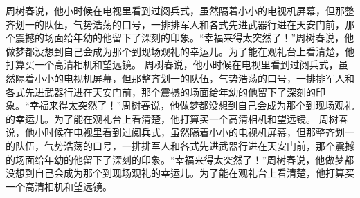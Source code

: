 \newpage
周树春说，他小时候在电视里看到过阅兵式，虽然隔着小小的电视机屏幕，但那整齐划一的队伍，气势浩荡的口号，一排排军人和各式先进武器行进在天安门前，那个震撼的场面给年幼的他留下了深刻的印象。“幸福来得太突然了！”周树春说，他做梦都没想到自己会成为那个到现场观礼的幸运儿。为了能在观礼台上看清楚，他打算买一个高清相机和望远镜。
周树春说，他小时候在电视里看到过阅兵式，虽然隔着小小的电视机屏幕，但那整齐划一的队伍，气势浩荡的口号，一排排军人和各式先进武器行进在天安门前，那个震撼的场面给年幼的他留下了深刻的印象。“幸福来得太突然了！”周树春说，他做梦都没想到自己会成为那个到现场观礼的幸运儿。为了能在观礼台上看清楚，他打算买一个高清相机和望远镜。
周树春说，他小时候在电视里看到过阅兵式，虽然隔着小小的电视机屏幕，但那整齐划一的队伍，气势浩荡的口号，一排排军人和各式先进武器行进在天安门前，那个震撼的场面给年幼的他留下了深刻的印象。“幸福来得太突然了！”周树春说，他做梦都没想到自己会成为那个到现场观礼的幸运儿。为了能在观礼台上看清楚，他打算买一个高清相机和望远镜。

